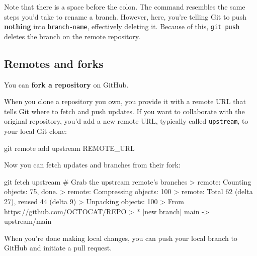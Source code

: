 Note that there is a space before the colon. The command resembles the same steps you'd take to rename a branch. However, here, you're telling Git to push \textbf{nothing} into \texttt{branch-name}, effectively deleting it. Because of this, \texttt{git push} deletes the branch on the remote repository. 

\subsection{Remotes and forks}

You can \textbf{fork a repository} on GitHub. 

When you clone a repository you own, you provide it with a remote URL that tells Git where to fetch and push updates. If you want to collaborate with the original repository, you'd add a new remote URL, typically called \texttt{upstream}, to your local Git clone:
\begin{codeblock}[language=bash]
git remote add upstream REMOTE_URL 
\end{codeblock}

Now you can fetch updates and branches from their fork:
\begin{codeblock}[language=bash]
git fetch upstream
# Grab the upstream remote's branches
> remote: Counting objects: 75, done.
> remote: Compressing objects: 100%
> remote: Total 62 (delta 27), reused 44 (delta 9)
> Unpacking objects: 100%
> From https://github.com/OCTOCAT/REPO
>  * [new branch]      main     -> upstream/main
\end{codeblock}

When you're done making local changes, you can push your local branch to GitHub and initiate a pull request. 

